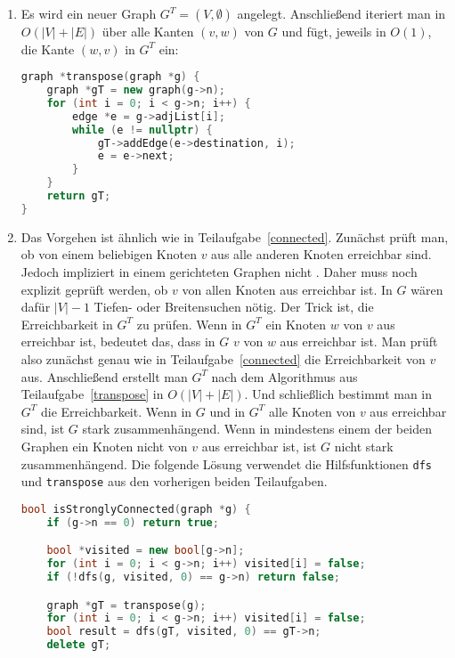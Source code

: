 \documentclass[11pt,a4paper]{article}
\begin{document}
\begin{loesung}
\begin{enumerate}
        \item
        Es wird ein neuer Graph $G^T = (V, \emptyset)$ angelegt.
        Anschließend iteriert man in $O(|V| + |E|)$ über alle Kanten $(v, w)$ von $G$ und fügt, jeweils in $O(1)$, die Kante $(w, v)$ in $G^T$ ein:
        \begin{lstlisting}[language=c++]
graph *transpose(graph *g) {
    graph *gT = new graph(g->n);
    for (int i = 0; i < g->n; i++) {
        edge *e = g->adjList[i];
        while (e != nullptr) {
            gT->addEdge(e->destination, i);
            e = e->next;
        }
    }
    return gT;
}
        \end{lstlisting}

        \item
        Das Vorgehen ist ähnlich wie in Teilaufgabe~\ref*{connected}.
        Zunächst prüft man, ob von einem beliebigen Knoten $v$ aus alle anderen Knoten erreichbar sind.
        Jedoch impliziert  in einem gerichteten Graphen nicht .
        Daher muss noch explizit geprüft werden, ob $v$ von allen Knoten aus erreichbar ist.
        In $G$ wären dafür $|V| - 1$ Tiefen- oder Breitensuchen nötig.
        Der Trick ist, die Erreichbarkeit in $G^T$ zu prüfen.
        Wenn in $G^T$ ein Knoten $w$ von $v$ aus erreichbar ist, bedeutet das, dass in $G$ $v$ von $w$ aus erreichbar ist.
        Man prüft also zunächst genau wie in Teilaufgabe~\ref*{connected} die Erreichbarkeit von $v$ aus. 
        Anschließend erstellt man $G^T$ nach dem Algorithmus aus Teilaufgabe~\ref*{transpose} in $O(|V| + |E|)$.
        Und schließlich bestimmt man in $G^T$ die Erreichbarkeit.
        Wenn in $G$ und in $G^T$ alle Knoten von $v$ aus erreichbar sind, ist $G$ stark zusammenhängend.
        Wenn in mindestens einem der beiden Graphen ein Knoten nicht von $v$ aus erreichbar ist, ist $G$ nicht stark zusammenhängend.
        Die folgende Lösung verwendet die Hilfsfunktionen \texttt{dfs} und \texttt{transpose} aus den vorherigen beiden Teilaufgaben.
        \begin{lstlisting}[language=c++]
bool isStronglyConnected(graph *g) {
    if (g->n == 0) return true;

    bool *visited = new bool[g->n];
    for (int i = 0; i < g->n; i++) visited[i] = false;
    if (!dfs(g, visited, 0) == g->n) return false;

    graph *gT = transpose(g);
    for (int i = 0; i < g->n; i++) visited[i] = false;
    bool result = dfs(gT, visited, 0) == gT->n;
    delete gT;


\end{lstlisting}
\end{enumerate}
\end{loesung}
\end{document}
